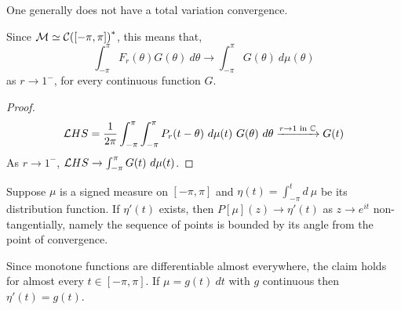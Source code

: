 \begin{remark}
	One generally does not have a total variation convergence.
\end{remark}
Since $\mathcal{M} \simeq \mathcal{C} {([-\pi, \pi])}^*$, this means that,
\[
	\int_{-\pi}^{\pi} F_r(\theta) G(\theta)\ d \theta
	\to \int_{-\pi}^{\pi} G(\theta)\ d \mu(\theta)
\]
as $r \to 1^-$, for every continuous function $G$.
\begin{proof}
	\[
		\mathcal{L} HS
		= \frac{1}{2 \pi} \int_{-\pi}^{\pi} \int_{-\pi}^{\pi} P_r(t - \theta)\ d \mu(t)\ G(\theta)\ d \theta
		\xrightarrow{r \to 1 \text{ in } \mathbb{C}}
		G(t)
	\]
	As $r \to 1^-$, $\mathcal{L} HS \to \int_{-\pi}^{\pi} G(t)\ d \mu(t)$.
\end{proof}
\begin{theorem}
	Suppose $\mu$ is a signed measure on $[-\pi, \pi]$ and $\eta(t) = \int_{-\pi}^{t} d\ \mu$ be its distribution function.
	If $\eta'(t)$ exists, then $P[\mu](z) \to \eta'(t)$ as $z \to e^{i t}$ non-tangentially, namely the sequence of points is bounded by its angle from the point of convergence.
\end{theorem}
Since monotone functions are differentiable almost everywhere, the claim holds for almost every $t \in [-\pi, \pi]$.
If $\mu = g(t)\ dt$ with $g$ continuous then $\eta'(t) = g(t)$.

